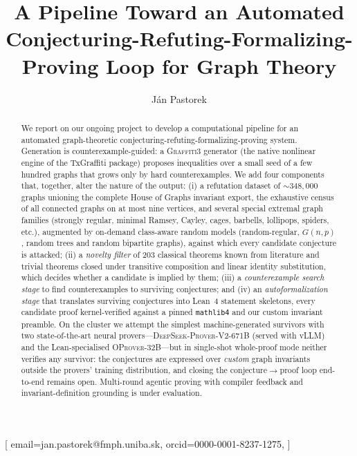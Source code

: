 \documentclass[]{ceurart}
\begin{document}


\title{A Pipeline Toward an Automated Conjecturing-Refuting-Formalizing-Proving Loop for Graph Theory}



\author[1]{J\'an Pastorek}[%
email=jan.pastorek@fmph.uniba.sk,
orcid=0000-0001-8237-1275,
]
\cormark[1]
\address[1]{Department of Applied Informatics, Comenius University in
  Bratislava, Bratislava, Slovakia}


\begin{abstract}
  We report on our ongoing project to develop a computational pipeline for an automated
  graph-theoretic conjecturing-refuting-formalizing-proving system. Generation is counterexample-guided: a \textsc{Graffiti3} generator (the native nonlinear engine of the TxGraffiti package) proposes inequalities over a small seed
  of a few hundred graphs that grows only by hard counterexamples. We add four components that,
  together, alter the
  nature of the output: (i) a refutation dataset of $\sim\!348{,}000$
  graphs unioning the complete House of Graphs invariant export, the exhaustive census of all connected
  graphs on at most nine vertices, and several special extremal graph families
  (strongly regular, minimal Ramsey, Cayley, cages, barbells, lollipops, spiders, etc.), augmented by on-demand class-aware random models (random-regular, $G(n,p)$, random trees and random bipartite graphs), against which every candidate conjecture is attacked; (ii) a \emph{novelty filter} of $203$ classical theorems known from literature
  and trivial theorems closed under transitive composition and linear
  identity substitution, which decides whether a candidate is implied by them; (iii) a \emph{counterexample search stage} to find counterexamples to surviving conjectures; and (iv) an \emph{autoformalization stage} that translates surviving conjectures into Lean~4 \cite{moura2015lean} statement skeletons, every candidate proof kernel-verified against a pinned \texttt{mathlib4} and our custom invariant preamble. On the cluster we attempt the simplest machine-generated survivors with two state-of-the-art neural provers---\textsc{DeepSeek-Prover-V2-671B} (served with vLLM) and the Lean-specialised \textsc{OProver-32B}---but in single-shot whole-proof mode neither verifies any survivor: the conjectures are expressed over \emph{custom} graph invariants outside the provers' training distribution, and closing the conjecture$\to$proof loop end-to-end remains open. Multi-round agentic proving with compiler feedback and invariant-definition grounding is under evaluation.
\end{abstract}
\end{document}
